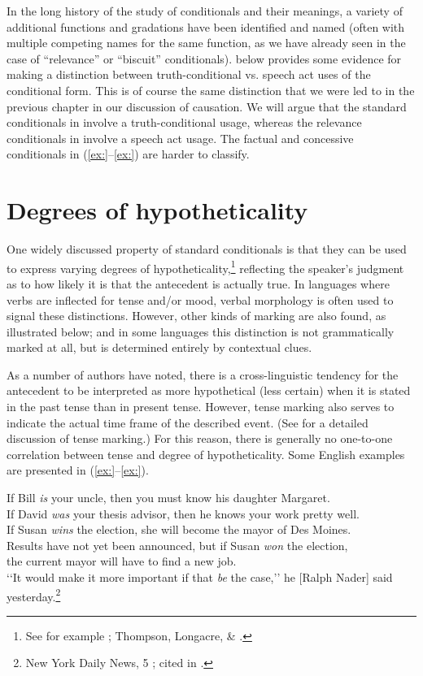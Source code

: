 In the long history of the study of conditionals and their meanings, a variety of additional functions and gradations have been identified and named (often with multiple competing names for the same function, as we have already seen in the case of “relevance” or “biscuit” conditionals).  below provides some evidence for making a distinction between truth-conditional vs. speech act uses of the conditional form. This is of course the same distinction that we were led to in the previous chapter in our discussion of causation. We will argue that the standard conditionals in  involve a truth-conditional usage, whereas the relevance conditionals in  involve a speech act usage. The factual and concessive conditionals in (\ref{ex:}--\ref{ex:}) are harder to classify.


\section{Degrees of hypotheticality}\label{sec:} %

One widely discussed property of standard conditionals is that they can be used to express varying degrees of hypotheticality,\footnote{See for example \citet{Comrie1986}; Thompson, Longacre, \& \citet{Hwang2007}.} reflecting the speaker’s judgment as to how likely it is that the antecedent is actually true. In languages where verbs are inflected for tense and/or mood, verbal morphology is often used to signal these distinctions. However, other kinds of marking are also found, as illustrated below; and in some languages this distinction is not grammatically marked at all, but is determined entirely by contextual clues.



As a number of authors have noted, there is a cross-linguistic tendency for the antecedent to be interpreted as more hypothetical (less certain) when it is stated in the past tense than in present tense. However, tense marking also serves to indicate the actual time frame of the described event. (See  for a detailed discussion of tense marking.) For this reason, there is generally no one-to-one correlation between tense and degree of hypotheticality. Some English examples are presented in (\ref{ex:}--\ref{ex:}).


\ea
\ea If Bill \textit{is} your uncle, then you must know his daughter Margaret.\\
\ex If David \textit{was} your thesis advisor, then he knows your work pretty well.\\
\ex If Susan \textit{wins} the election, she will become the mayor of Des Moines.\\
\ex Results have not yet been announced, but if Susan \textit{won} the election,\\
  the current mayor will have to find a new job.\\
\ex ‘‘It would make it more important if that \textit{be} the case,’’ he [Ralph Nader] said\\
  yesterday.\footnote{New York Daily News, 5 \citealt{February2007}; cited in \citet{Gomes2008}.}
                       \z
\z


